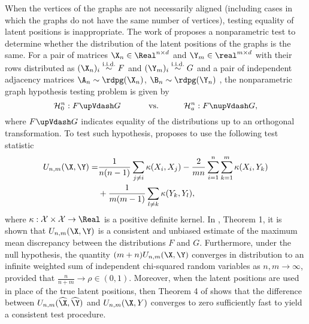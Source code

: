When the vertices of the graphs are not necessarily aligned (including cases in which the graphs do not have the same number of vertices), testing equality of latent positions is inappropriate. The work of \cite{tang2017nonparametric} proposes a nonparametric test to determine whether the distribution of the latent positions of the graphs is the same. For a pair of matrices $\X_n\in\Real^{n\times d}$ and $\Y_m\in\real^{m\times d}$ with their rows distributed as $(\X_n)_i\overset{\text{i.i.d.}}{\sim} F$ and $(\Y_m)_i\overset{\text{i.i.d.}}{\sim} G$ and a pair of independent adjacency matrices $\A_n\sim\rdpg(\X_n)$, $\B_n\sim\rdpg(\Y_n)$ , the nonparametric graph hypothesis testing problem is given by
\begin{equation*}
    \mathcal{H}^n_0:F \upVdash G \quad\quad\quad \text{ vs.}\quad\quad\quad \mathcal{H}^n_a: F \nupVdash G,
\end{equation*}
where $F\upVdash G$ indicates equality of the distributions up to an orthogonal transformation. To test such hypothesis, \cite{tang2017nonparametric} proposes to use the following test statistic
\begin{align*}
    U_{n,m}(\X, \Y)=& \frac{1}{n(n-1)}\sum_{j\neq i}\kappa(X_i, X_j)-\frac{2}{mn}\sum_{i=1}^n\sum_{k=1}^m\kappa(X_i, Y_k)\\
    & + \frac{1}{m(m-1)}\sum_{l\neq k}\kappa(Y_k, Y_l),
\end{align*}
where $\kappa:\mathcal{X}\times \mathcal{X}\rightarrow\Real$ is a positive definite kernel. In \cite{tang2017nonparametric}, Theorem 1, it is shown that $U_{n,m}(\X, \Y)$ is a consistent and unbiased estimate of the maximum mean discrepancy \cite{gretton2012kernel} between the distributions $F$ and $G$. Furthermore, under the null hypothesis, the quantity $(m+n)U_{n,m}(\X, \Y)$ converges in distribution to an infinite weighted sum of independent chi-squared random variables as $n,m\rightarrow \infty$, provided that $\frac{n}{n+m}\rightarrow \rho \in (0, 1)$.  Moreover, when the latent positions are used in place of the true latent positions, then Theorem 4 of \cite{tang2017nonparametric} shows that the difference between $U_{n,m}(\widehat{\X}, \widehat{\Y})$  and $U_{n,m}(\X, Y)$ converges to zero sufficiently fast to yield a consistent test procedure.


